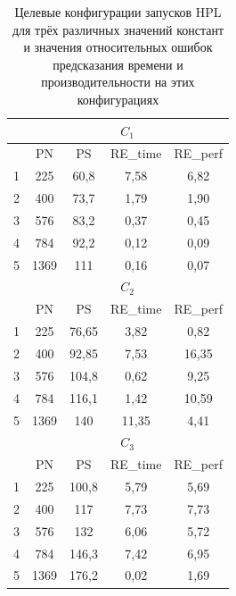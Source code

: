 	\begin{table}
		\centering
		\begin{tabular}{|r||c|c|c|c|}
			\hline
			            & \multicolumn{4}{|c|}{\(C_1\)}     \\ \hline
			\textnumero &   PN &   PS & RE\_time & RE\_perf \\ \hline
			          1 &  225 & 60,8 &     7,58 & 6,82     \\ \hline
			          2 &  400 & 73,7 &     1,79 & 1,90     \\ \hline
			          3 &  576 & 83,2 &     0,37 & 0,45     \\ \hline
			          4 &  784 & 92,2 &     0,12 & 0,09     \\ \hline
			          5 & 1369 &  111 &     0,16 & 0,07     \\ \hline
			\hline
			            & \multicolumn{4}{|c|}{\(C_2\)}      \\ \hline
			\textnumero &   PN &    PS & RE\_time & RE\_perf \\ \hline
			          1 &  225 & 76,65 &     3,82 & 0,82     \\ \hline
			          2 &  400 & 92,85 &     7,53 & 16,35    \\ \hline
			          3 &  576 & 104,8 &     0,62 & 9,25     \\ \hline
			          4 &  784 & 116,1 &     1,42 & 10,59    \\ \hline
			          5 & 1369 &   140 &    11,35 & 4,41     \\ \hline
			\hline
			            & \multicolumn{4}{|c|}{\(C_3\)}      \\ \hline
			\textnumero &   PN &    PS & RE\_time & RE\_perf \\ \hline
			          1 &  225 & 100,8 &     5,79 & 5,69     \\ \hline
			          2 &  400 &   117 &     7,73 & 7,73     \\ \hline
			          3 &  576 &   132 &     6,06 & 5,72     \\ \hline
			          4 &  784 & 146,3 &     7,42 & 6,95     \\ \hline
			          5 & 1369 & 176,2 &     0,02 & 1,69     \\ \hline
		\end{tabular}
		\caption{Целевые конфигурации запусков HPL для трёх различных значений констант и значения относительных ошибок предсказания времени и производительности на этих конфигурациях}
		\label{target_HPL}
	\end{table}


